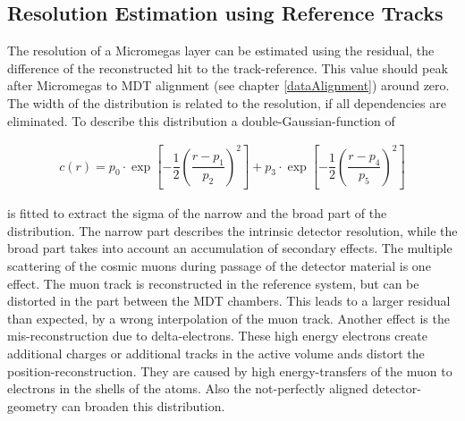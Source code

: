 \documentclass[
twoside,            %
BCOR1.4cm,          %
10pt,               %
headings=normal,    %
headsepline,        %
clearplainpage,		%
final,              %
div=14,
open=right,
bibliography=toc
]{scrreprt}
\begin{document}
\subsection{Resolution Estimation using Reference Tracks}\label{resolutionEstimation}

The resolution of a Micromegas layer can be estimated using the residual, the difference of the reconstructed hit to the track-reference.
This value should peak after Micromegas to MDT alignment (see chapter \ref{dataAlignment}) around zero.
The width of the distribution is related to the resolution, if all dependencies are eliminated.
To describe this distribution a double-Gaussian-function of

\begin{align}
	c(r) = 
			p_{0} \cdot \exp\left[ -\dfrac{1}{2} \left(\dfrac{r - p_{1}}{p_{2}}\right)^2\right] + 
			p_{3} \cdot \exp\left[ -\dfrac{1}{2} \left(\dfrac{r - p_{4}}{p_{5}}\right)^2\right]
	\label{doubleGaussian}
\end{align}

is fitted to extract the sigma of the narrow and the broad part of the distribution.
The narrow part describes the intrinsic detector resolution, while the broad part takes into account an accumulation of secondary effects.
The multiple scattering of the cosmic muons during passage of the detector material is one effect.
The muon track is reconstructed in the reference system, but can be distorted in the part between the MDT chambers.
This leads to a larger residual than expected, by a wrong interpolation of the muon track.
Another effect is the mis-reconstruction due to delta-electrons.
These high energy electrons create additional charges or additional tracks in the active volume ands distort the position-reconstruction.
They are caused by high energy-transfers of the muon to electrons in the shells of the atoms.
Also the not-perfectly aligned detector-geometry can broaden this distribution.
\end{document}
